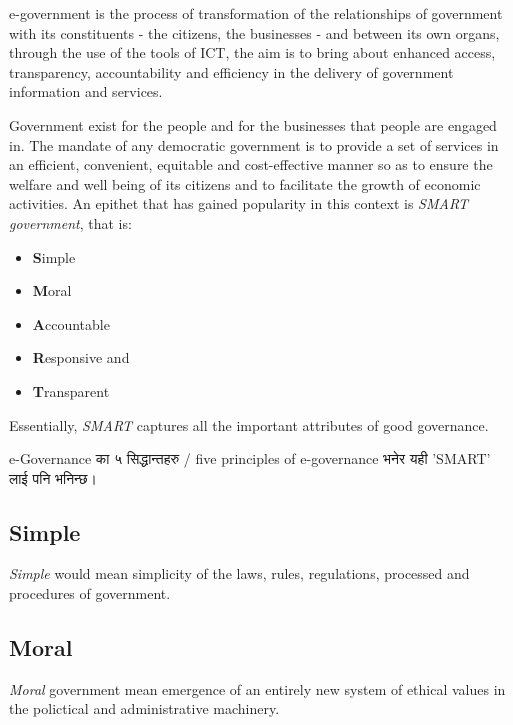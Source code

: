 e-government is the process of transformation of the relationships of government with its constituents - the citizens, the businesses - and between its own organs, through the use of the tools of ICT, the aim is to bring about enhanced access, transparency, accountability and efficiency in the delivery of government information and services.

Government exist for the people and for the businesses that people are engaged in. The mandate of any democratic government is to provide a set of services in an efficient, convenient, equitable and cost-effective manner so as to ensure the welfare and well being of its citizens and to facilitate the growth of economic activities. An epithet that has gained popularity in this context is \textit{SMART government}, that is:
\begin{multicols}{3}
	\begin{itemize}
		\item \textbf{S}imple
		\item \textbf{M}oral
		\item \textbf{A}ccountable
		\item \textbf{R}esponsive and
		\item \textbf{T}ransparent
	\end{itemize}
\end{multicols}

Essentially, \textit{SMART} captures all the important attributes of good governance.


\begin{framed}
	\begin{nepali}
		\noindent e-Governance का ५ सिद्धान्तहरु / five principles of  e-governance भनेर यही 'SMART' लाई पनि भनिन्छ।
	\end{nepali}
\end{framed}

\subsection*{Simple}
\textit{Simple} would mean simplicity of the laws, rules, regulations, processed and procedures of government.

\subsection*{Moral}
\textit{Moral} government mean emergence of an entirely new system of ethical values in the polictical and administrative machinery.

